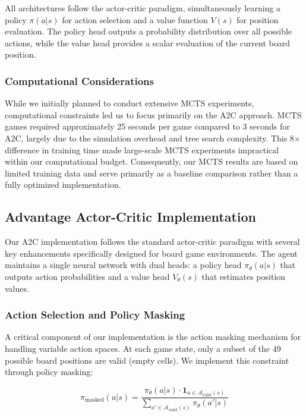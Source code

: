 \documentclass[conference]{IEEEtran}
\begin{document}
All architectures follow the actor-critic paradigm, simultaneously learning a policy $\pi(a|s)$ for action selection and a value function $V(s)$ for position evaluation. The policy head outputs a probability distribution over all possible actions, while the value head provides a scalar evaluation of the current board position.

\subsubsection{Computational Considerations}

While we initially planned to conduct extensive MCTS experiments, computational constraints led us to focus primarily on the A2C approach. MCTS games required approximately 25 seconds per game compared to 3 seconds for A2C, largely due to the simulation overhead and tree search complexity. This 8× difference in training time made large-scale MCTS experiments impractical within our computational budget. Consequently, our MCTS results are based on limited training data and serve primarily as a baseline comparison rather than a fully optimized implementation.

\subsection{Advantage Actor-Critic Implementation}

Our A2C implementation follows the standard actor-critic paradigm with several key enhancements specifically designed for board game environments. The agent maintains a single neural network with dual heads: a policy head $\pi_{\theta}(a|s)$ that outputs action probabilities and a value head $V_{\theta}(s)$ that estimates position values.

\subsubsection{Action Selection and Policy Masking}

A critical component of our implementation is the action masking mechanism for handling variable action spaces. At each game state, only a subset of the 49 possible board positions are valid (empty cells). We implement this constraint through policy masking:

\begin{equation}
\pi_{\text{masked}}(a|s) = \frac{\pi_{\theta}(a|s) \cdot \mathbf{1}_{a \in \mathcal{A}_{\text{valid}}(s)}}{\sum_{a' \in \mathcal{A}_{\text{valid}}(s)} \pi_{\theta}(a'|s)}
\end{equation}
\end{document}
